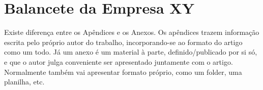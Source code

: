 \documentclass[twoside,english,brazilian]{UNISINOSartigo}
\begin{document}
\annex
\section{Balancete da Empresa XY}

Existe diferença entre os Apêndices e os Anexos.  Os apêndices trazem informação escrita pelo próprio autor do trabalho, incorporando-se ao formato do artigo como um todo.  Já um anexo é um material à parte, definido/publicado por si só, e que o autor julga conveniente ser apresentado juntamente com o artigo.  Normalmente também vai apresentar formato próprio, como um folder, uma planilha, etc.
\end{document}
